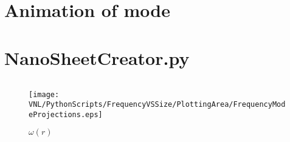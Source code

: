 
\appendix
\appendixpage
\addappheadtotoc
\section{Animation of  mode}
\begin{center}
\end{center}
\section{NanoSheetCreator.py}
\label{NSCstart}
\inputminted[python3=true,bgcolor=Black,linenos=true]{python}{VNL/PythonScripts/NanoSheetCreator.py}
\label{NSCend}
\begin{figure}
  \texttt{[image: VNL/PythonScripts/FrequencyVSSize/PlottingArea/FrequencyModeProjections.eps]}
  \caption{$\omega(r)$}
  \label{OR}
\end{figure}
\newpage

